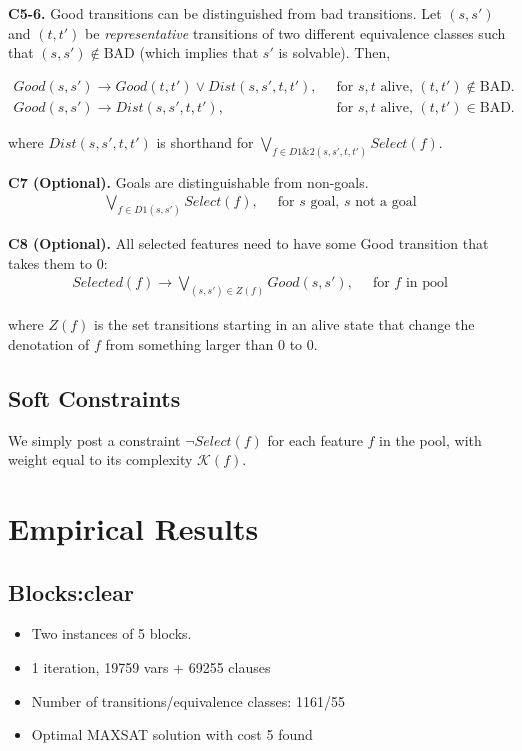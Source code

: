 \documentclass[a4paper]{article}
\newcommand{\smallpar}[1]{{\vspace{10pt}\noindent \bf #1.}}
\newcommand{\badtx}{\ensuremath{\mathrm{BAD}}}
\begin{document}
\smallpar{C5-6}
Good transitions can be distinguished from bad transitions.
Let $(s, s')$ and $(t, t')$ be \emph{representative} transitions
of two different equivalence classes such that $(s, s') \not\in \badtx$
(which implies that $s'$ is solvable). Then,

\begin{align}
 Good(s, s') \rightarrow Good(t, t') \lor
 Dist(s, s', t, t'),&\;\; \text{for $s, t$ alive, $(t, t') \not\in \badtx$.} \\
 Good(s, s') \rightarrow
 Dist(s, s', t, t'),&\;\; \text{for $s, t$ alive, $(t, t') \in \badtx$.}
\end{align}

\noindent where $Dist(s, s', t, t')$ is shorthand for $\bigvee_{f \in D1\&2(s, s', t, t')} Select(f)$.


\smallpar{C7 (Optional)}
Goals are distinguishable from non-goals.
\begin{align}
\bigvee_{f \in D1(s, s')} Select(f),&\;\; \text{for $s$ goal, $s$ not a goal}
\end{align}

\smallpar{C8 (Optional)}
All selected features need to have some Good transition that takes them to $0$:
\begin{align}
 Selected(f) \rightarrow \bigvee_{(s, s') \in Z(f)} Good(s, s'),&\;\; \text{for $f$ in pool}
\end{align}

\noindent where $Z(f)$ is the set transitions starting in an alive state that change the denotation of $f$ from something
larger than 0 to 0.


\subsection{Soft Constraints}
We simply post a constraint $\neg Select(f)$ for each feature $f$ in the pool, with weight equal to its complexity $\mathcal{K}(f)$.

\section{Empirical Results}

\subsection{Blocks:clear}
\begin{itemize}
 \item Two instances of 5 blocks.
 \item 1 iteration, 19759 vars + 69255 clauses
 \item Number of transitions/equivalence classes: 1161/55
 \item Optimal MAXSAT solution with cost 5 found
\end{itemize}
\end{document}

